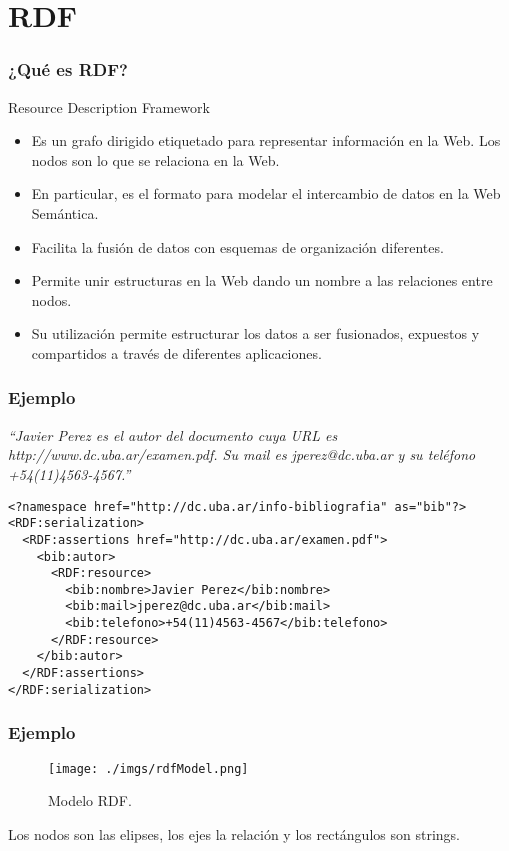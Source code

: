 \documentclass{beamer}
\begin{document}
\section{RDF}
\begin{frame}[fragile] %
\frametitle{¿Qué es RDF?}
\begin{block}{Resource Description Framework}
\begin{itemize}
\item<1-> Es un grafo dirigido etiquetado para representar información en la Web. Los nodos son lo que se relaciona en la Web.
\item<2-> En particular, es el formato para modelar el intercambio de datos en la Web Semántica. 
\item<3-> Facilita la fusión de datos con esquemas de organización diferentes.
\item<4-> Permite unir estructuras en la Web dando un nombre a las relaciones entre nodos.
\item<5-> Su utilización permite estructurar los datos a ser fusionados, expuestos y compartidos a través de diferentes aplicaciones.
\end{itemize}
\end{block}
\end{frame}

\begin{frame}[fragile]
\frametitle{Ejemplo}
\textit{``Javier Perez es el autor del documento cuya URL es http://www.dc.uba.ar/examen.pdf. Su mail es jperez@dc.uba.ar y su teléfono +54(11)4563-4567.''}
\begin{verbatim}
<?namespace href="http://dc.uba.ar/info-bibliografia" as="bib"?> 
<RDF:serialization> 
  <RDF:assertions href="http://dc.uba.ar/examen.pdf"> 
    <bib:autor> 
      <RDF:resource> 
        <bib:nombre>Javier Perez</bib:nombre> 
        <bib:mail>jperez@dc.uba.ar</bib:mail> 
        <bib:telefono>+54(11)4563-4567</bib:telefono> 
      </RDF:resource> 
    </bib:autor> 
  </RDF:assertions> 
</RDF:serialization>

\end{verbatim}
\end{frame}

\begin{frame}[fragile]
\frametitle{Ejemplo} 
\begin{center}
\begin{figure}[H] %
\texttt{[image: ./imgs/rdfModel.png]}
\caption{Modelo RDF.}
\end{figure}
Los nodos son las elipses, los ejes la relación y los rectángulos son strings.
\end{center}
\end{frame}
\end{document}

